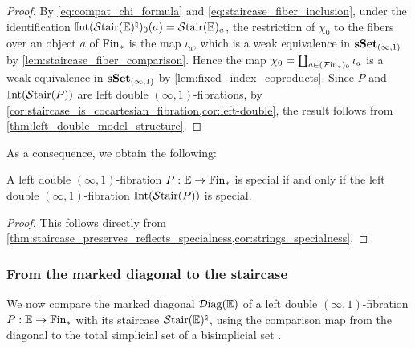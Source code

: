 \documentclass[10pt,reqno]{amsart}
\begin{document}
\begin{proof}
By \eqref{eq:compat_chi_formula} and
\eqref{eq:staircase_fiber_inclusion}, under the identification
$\mathbb{I}\mathrm{nt}(\mathcal{S}\mathrm{tair}(\mathbb E)^\natural)_0(a)=\mathcal{S}\mathrm{tair}(\mathbb E)_a$, the
restriction of $\chi_0$ to the fibers over an object $a$ of
$\mathrm{Fin}_*$ is the map $\iota_a$, which is a weak equivalence in
$\mathbf{sSet}_{(\infty,1)}$ by \cref{lem:staircase_fiber_comparison}. Hence
the map $\chi_0=\coprod_{a\in (\mathcal{F}\mathrm{in}_*)_0}\iota_a$ is a weak
equivalence in $\mathbf{sSet}_{(\infty,1)}$ by
\cref{lem:fixed_index_coproducts}. Since $P$ and
$\mathbb{I}\mathrm{nt}(\mathcal{S}\mathrm{tair}(P))$ are left double $(\infty,1)$-fibrations, by
\cref{cor:staircase_is_cocartesian_fibration,cor:left-double}, the
result follows from \cref{thm:left_double_model_structure}.
\end{proof}

As a consequence, we obtain the following:

\begin{corollary}
\label{cor:first_roundtrip_special}
A left double $(\infty,1)$-fibration $P:\mathbb E\to\mathbb{F}\mathrm{in}_*$ is
special if and only if the left double $(\infty,1)$-fibration
$\mathbb{I}\mathrm{nt}(\mathcal{S}\mathrm{tair}(P))$ is special.
\end{corollary}

\begin{proof}
This follows directly from
\cref{thm:staircase_preserves_reflects_specialness,cor:strings_specialness}.
\end{proof}

\subsubsection{From the marked diagonal to the staircase}
\label{subsubsec:diagonal_to_staircase}

We now compare the marked diagonal $\mathcal{D}\mathrm{iag}(\mathbb E)$ of a left
double $(\infty,1)$-fibration $P:\mathbb E\to\mathbb{F}\mathrm{in}_*$ with its
staircase $\mathcal{S}\mathrm{tair}(\mathbb E)^\natural$, using the comparison map
from the diagonal to the total simplicial set of a bisimplicial set
\cite{CegarraRemedios2005,Stevenson2025TotalSimplicialSet}.
\end{document}
